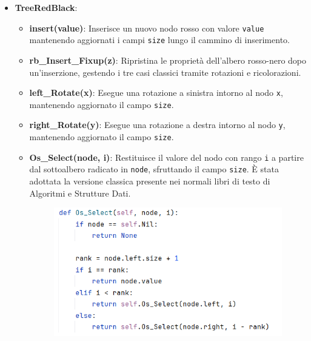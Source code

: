 \documentclass[10pt]{article}
\begin{document}
\begin{itemize}
\begin{itemize}
        \item \textbf{os\_rank(value)}: Calcola il rango (posizione in ordine crescente) del nodo contenente il valore specificato. Scorre l’albero con una visita \texttt{in-order} fino a trovare il nodo con quel valore e restituisce la sua posizione. L'implementazione della visita \texttt{in-order} è stato implementato a livello iterativo sempre per il motivo specificato precedentemente.

        \item \textbf{print(root)}: Stampa i valori dei nodi dell’albero in ordine crescente, eseguendo una visita ricorsiva in-order a partire dalla radice.
    \end{itemize}
    \item \textbf{TreeRedBlack}:
        \begin{itemize}
        \item \textbf{insert(value)}: Inserisce un nuovo nodo rosso con valore \texttt{value} mantenendo aggiornati i campi \texttt{size} lungo il cammino di inserimento.
        \item \textbf{rb\_Insert\_Fixup(z)}: Ripristina le proprietà dell'albero rosso-nero dopo un'inserzione, gestendo i tre casi classici tramite rotazioni e ricolorazioni.
        \item \textbf{left\_Rotate(x)}: Esegue una rotazione a sinistra intorno al nodo \texttt{x}, mantenendo aggiornato il campo \texttt{size}.
        \item \textbf{right\_Rotate(y)}: Esegue una rotazione a destra intorno al nodo \texttt{y}, mantenendo aggiornato il campo \texttt{size}.
        \item \textbf{Os\_Select(node, i)}: Restituisce il valore del nodo con rango \texttt{i} a partire dal sottoalbero radicato in \texttt{node}, sfruttando il campo \texttt{size}. \`E stata adottata la versione classica presente nei normali libri di testo di Algoritmi e Strutture Dati.
        \begin{figure}[H]
            \centering
            \includegraphics[width=0.65\linewidth]{resources/pseudoSelect.png}

\end{figure}
\end{itemize}
\end{itemize}
\end{document}
